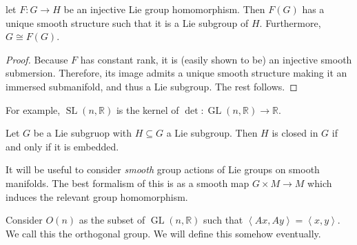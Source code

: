 \begin{proposition}\label{3.0.17}
	let $F : G \to H$ be an injective Lie group homomorphism. Then $F(G)$ has a unique smooth structure such that it is a Lie subgroup of $H$. Furthermore, $G\cong F(G)$.
\end{proposition}
\begin{proof}
	Because $F$ has constant rank, it is (easily shown to be) an injective smooth submersion. Therefore, its image admits a unique smooth structure making it an immersed submanifold, and thus a Lie subgroup. The rest follows.
\end{proof}

For example, $\operatorname{SL} (n,\mathbb{R} )$ is the kernel of $\det : \operatorname{GL} (n,\mathbb{R}  )\to \mathbb{R} $.

\begin{theorem}\label{3.0.18}
	Let $G$ be a Lie subgruop with $H\subseteq G$ a Lie subgroup. Then $H$ is closed in $G$ if and only if it is embedded.
\end{theorem}

It will be useful to consider \emph{smooth} group actions of Lie groups on smooth manifolds. The best formalism of this is as a smooth map $G\times M\to M$ which induces the relevant group homomorphism.

Consider $O(n)$ as the subset of $\operatorname{GL} (n,\mathbb{R} )$ such that $\left\langle Ax,Ay \right\rangle =\left\langle x,y \right\rangle $. We call this the orthogonal group. We will define this somehow eventually.
